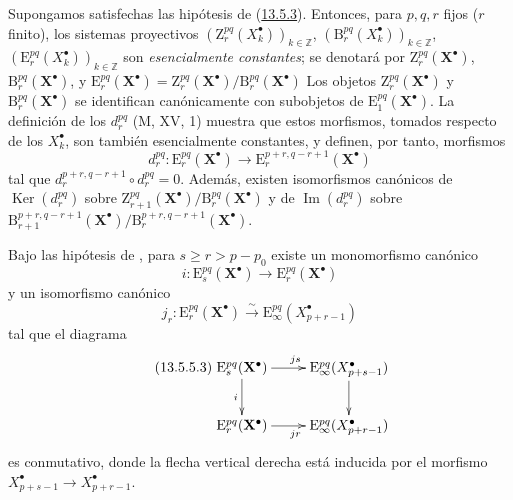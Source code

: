 \begin{env}[13.5.4]
\label{0.13.5.4-fr}
Supongamos satisfechas las hipótesis de (\hyperref[0.13.5.3-fr]{13.5.3}). Entonces, para $p,q,r$ fijos ($r$ finito), los sistemas proyectivos $(\mathrm Z_r^{pq}(X_k^\bullet))_{k\in\mathbb Z}$, $(\mathrm B_r^{pq}(X_k^\bullet))_{k\in\mathbb Z}$, $(\mathrm E_r^{pq}(X_k^\bullet))_{k\in\mathbb Z}$ son \emph{esencialmente constantes}; se denotará por $\mathrm Z_r^{pq}(\mathbf X^\bullet)$,
$\mathrm B_r^{pq}(\mathbf X^\bullet)$, y
$\mathrm E_r^{pq}(\mathbf X^\bullet)=
\mathrm Z_r^{pq}(\mathbf X^\bullet)/
\mathrm B_r^{pq}(\mathbf X^\bullet)$
Los objetos $\mathrm Z_r^{pq}(\mathbf X^\bullet)$ y
$\mathrm B_r^{pq}(\mathbf X^\bullet)$ se identifican canónicamente con
subobjetos de $\mathrm E_1^{pq}(\mathbf X^\bullet)$.
La definición de los $d_r^{pq}$ (M, XV, 1) muestra que estos
morfismos, tomados respecto de los $X_k^\bullet$, son también esencialmente
constantes, y definen, por tanto, morfismos
\begin{equation}
\label{0.13.5.4.1-fr}
\tag{13.5.4.1}
d_r^{pq}:\mathrm E_r^{pq}(\mathbf X^\bullet)
\longrightarrow\mathrm E_r^{p+r,q-r+1}(\mathbf X^\bullet)
\end{equation}
tal que
$d_r^{p+r,q-r+1}\circ d_r^{pq}=0$.
Además, existen isomorfismos canónicos de
$\operatorname{Ker}(d_r^{pq})$ sobre
$\mathrm Z_{r+1}^{pq}(\mathbf X^\bullet)/
\mathrm B_r^{pq}(\mathbf X^\bullet)$
y de $\operatorname{Im}(d_r^{pq})$ sobre
$\mathrm B_{r+1}^{p+r,q-r+1}(\mathbf X^\bullet)/
\mathrm B_r^{p+r,q-r+1}(\mathbf X^\bullet)$.
\end{env}

\begin{lemma}[13.5.5]
\label{0.13.5.5}
\label{0.13.5.5-fr}
Bajo las hipótesis de , para
$s\geq r>p-p_0$ existe un monomorfismo canónico
\begin{equation}
\label{0.13.5.5.1-fr}
\tag{13.5.5.1}
i:\mathrm E_s^{pq}(\mathbf X^\bullet)
\longrightarrow\mathrm E_r^{pq}(\mathbf X^\bullet)
\end{equation}
y un isomorfismo canónico
\begin{equation}
\label{0.13.5.5.2-fr}
\tag{13.5.5.2}
j_r:\mathrm E_r^{pq}(\mathbf X^\bullet)
\xrightarrow{\sim}\mathrm E_\infty^{pq}(X_{p+r-1}^\bullet)
\end{equation}
tal que el diagrama
\begin{equation}
\label{0.13.5.5.3-fr}
\tag{13.5.5.3}
\xymatrix{
\mathrm E_s^{pq}(\mathbf X^\bullet)\ar[r]^{js}\ar[d]_i
&\mathrm E_\infty^{pq}(X_{p+s-1}^\bullet)\ar[d]\\
\mathrm E_r^{pq}(\mathbf X^\bullet)\ar[r]_{jr}
&\mathrm E_\infty^{pq}(X_{p+r-1}^\bullet)
}
\end{equation}
es conmutativo, donde la flecha vertical derecha está inducida por el
morfismo
$X_{p+s-1}^\bullet\to X_{p+r-1}^\bullet$.
\end{lemma}

